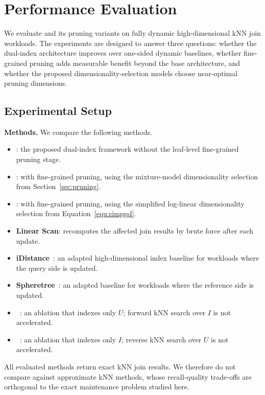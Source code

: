 \section{Performance Evaluation}\label{sec:exp}

We evaluate \dualtree and its pruning variants on fully dynamic high-dimensional kNN join workloads. The experiments are designed to answer three questions: whether the dual-index architecture improves over one-sided dynamic baselines, whether fine-grained pruning adds measurable benefit beyond the base architecture, and whether the proposed dimensionality-selection models choose near-optimal pruning dimensions.

\subsection{Experimental Setup}

\noindent\textbf{Methods.}
We compare the following methods.

\begin{itemize}
    \item \textbf{\dualtree}: the proposed dual-index framework without the leaf-level fine-grained pruning stage.
    \item \textbf{\dualtreeopt}: \dualtree with fine-grained pruning, using the mixture-model dimensionality selection from Section~\ref{sec:pruning}.
    \item \textbf{\dualtreefast}: \dualtree with fine-grained pruning, using the simplified log-linear dimensionality selection from Equation~\ref{equ:simppd}.
    \item \textbf{Linear Scan}: recomputes the affected join results by brute force after each update.
    \item \textbf{iDistance}~\cite{jagadish2005idistance}: an adapted high-dimensional index baseline for workloads where the query side is updated.
    \item \textbf{Spheretree}~\cite{yang2014continuous}: an adapted baseline for workloads where the reference side is updated.
    \item \textbf{\hdrtree}~\cite{ukey2022efficient}: an ablation that indexes only $U$; forward kNN search over $I$ is not accelerated.
    \item \textbf{\deltatree}~\cite{cui2003contorting}: an ablation that indexes only $I$; reverse kNN search over $U$ is not accelerated.
\end{itemize}

All evaluated methods return exact kNN join results. We therefore do not compare against approximate kNN methods, whose recall-quality trade-offs are orthogonal to the exact maintenance problem studied here.

